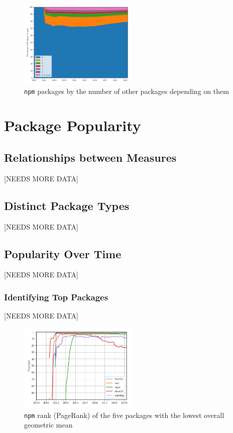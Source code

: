 \documentclass[10pt,conference]{IEEEtran}
\def\code#1{\texttt{#1}}
\begin{document}
\begin{figure}
  \includegraphics[width=0.5\textwidth]{figures/npm_deps_monthly_in_degree.pdf}
  \caption{\code{npm} packages by the number of other packages depending on them}
  \label{inDegree}
\end{figure}




\section{Package Popularity}



\subsection{Relationships between Measures}
[NEEDS MORE DATA]

\subsection{Distinct Package Types}
[NEEDS MORE DATA]

\subsection{Popularity Over Time}
[NEEDS MORE DATA]

\subsubsection{Identifying Top Packages}
[NEEDS MORE DATA]

\begin{figure}
  \includegraphics[width=0.5\textwidth]{figures/geo_mean_highest_pagerank.pdf}
  \caption{\code{npm} rank (PageRank) of the five packages with the lowest overall geometric mean}
  \label{topFive}
\end{figure}
\end{document}
